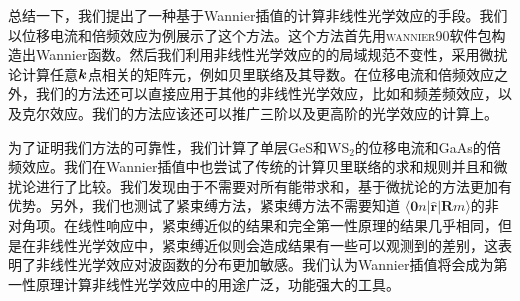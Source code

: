 总结一下，我们提出了一种基于Wannier插值的计算非线性光学效应的手段。我们以位移电流和倍频效应为例展示了这个方法。这个方法首先用\textsc{wannier90}软件包构造出Wannier函数。然后我们利用非线性光学效应的的局域规范不变性，采用微扰论计算任意$\boldsymbol{k}$点相关的矩阵元，例如贝里联络及其导数。在位移电流和倍频效应之外，我们的方法还可以直接应用于其他的非线性光学效应，比如和频差频效应，以及克尔效应。我们的方法应该还可以推广三阶以及更高阶的光学效应的计算上。

为了证明我们方法的可靠性，我们计算了单层GeS和WS$_{2}$的位移电流和GaAs的倍频效应。我们在Wannier插值中也尝试了传统的计算贝里联络的求和规则并且和微扰论进行了比较。我们发现由于不需要对所有能带求和，基于微扰论的方法更加有优势。另外，我们也测试了紧束缚方法，紧束缚方法不需要知道 $\langle\mathbf{0}n|\hat{\mathbf{r}}|\mathbf{R}m\rangle$的非对角项。在线性响应中，紧束缚近似的结果和完全第一性原理的结果几乎相同，但是在非线性光学效应中，紧束缚近似则会造成结果有一些可以观测到的差别，这表明了非线性光学效应对波函数的分布更加敏感。我们认为Wannier插值将会成为第一性原理计算非线性光学效应中的用途广泛，功能强大的工具。

